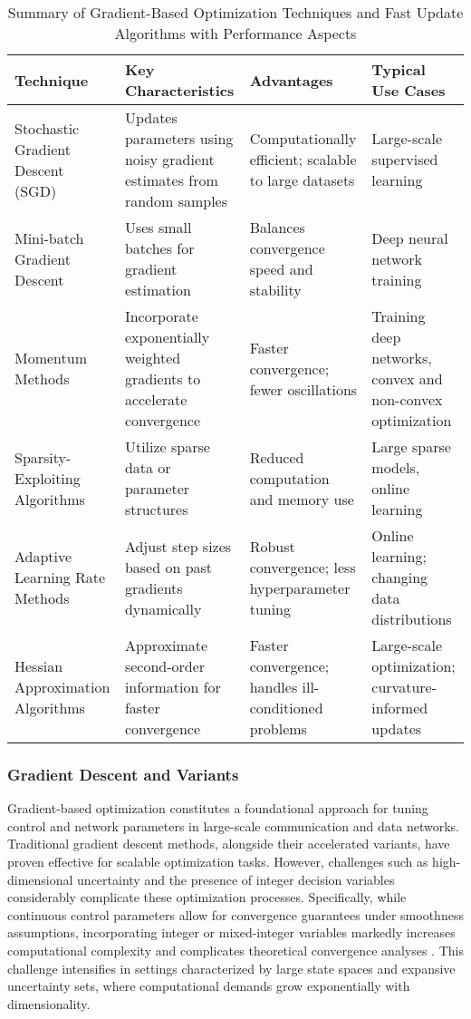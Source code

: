 \documentclass[sigconf]{acmart}
\begin{document}
\begin{table*}[htbp]
\centering
\caption{Summary of Gradient-Based Optimization Techniques and Fast Update Algorithms with Performance Aspects}
\label{tab:gradient_optimization_summary}
\begin{adjustbox}{max width=\textwidth}
\begin{tabular}{@{}llll@{}}
\toprule
\textbf{Technique} & \textbf{Key Characteristics} & \textbf{Advantages} & \textbf{Typical Use Cases} \\ 
\midrule
Stochastic Gradient Descent (SGD) & Updates parameters using noisy gradient estimates from random samples & Computationally efficient; scalable to large datasets & Large-scale supervised learning \\ 
Mini-batch Gradient Descent & Uses small batches for gradient estimation & Balances convergence speed and stability & Deep neural network training \\ 
Momentum Methods & Incorporate exponentially weighted gradients to accelerate convergence & Faster convergence; fewer oscillations & Training deep networks, convex and non-convex optimization \\ 
Sparsity-Exploiting Algorithms & Utilize sparse data or parameter structures & Reduced computation and memory use & Large sparse models, online learning \\ 
Adaptive Learning Rate Methods & Adjust step sizes based on past gradients dynamically & Robust convergence; less hyperparameter tuning & Online learning; changing data distributions \\ 
Hessian Approximation Algorithms & Approximate second-order information for faster convergence & Faster convergence; handles ill-conditioned problems & Large-scale optimization; curvature-informed updates \\ 
\bottomrule
\end{tabular}
\end{adjustbox}
\end{table*}

\subsubsection{Gradient Descent and Variants}

Gradient-based optimization constitutes a foundational approach for tuning control and network parameters in large-scale communication and data networks. Traditional gradient descent methods, alongside their accelerated variants, have proven effective for scalable optimization tasks. However, challenges such as high-dimensional uncertainty and the presence of integer decision variables considerably complicate these optimization processes. Specifically, while continuous control parameters allow for convergence guarantees under smoothness assumptions, incorporating integer or mixed-integer variables markedly increases computational complexity and complicates theoretical convergence analyses \cite{ref36}. This challenge intensifies in settings characterized by large state spaces and expansive uncertainty sets, where computational demands grow exponentially with dimensionality.
\end{document}
